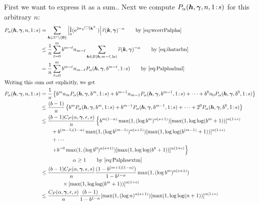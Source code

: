 \documentclass[authoryear]{elsarticle}
\newcommand{\tr}{\widetilde{r}}
\DeclareMathOperator{\appxint}{\hat{I}}
\newcommand{\onetos}{1\!:\!s}
\newcommand{\LarysaNote}[1]{{\color{violet}#1}}
\begin{document}
\LarysaNote{First we want to express it as a sum.. } 
Next we compute $P_\alpha(\vh,\vgamma,n,\onetos)$ for this arbitrary $n$:
\begin{align*}
      P_\alpha(\vh,\vgamma,n,\onetos) & = \sum_{\vk \in \integers^s \setminus\{\vzero\}} \abs{\appxint_n(\me^{2 \pi \sqrt{-1} \vk^T \cdot})}\tr(\vk,\vgamma)^{-\alpha} \qquad \text{by \eqref{eq:wcerrPalpha}} \\
      & \le \frac {1}{n} \sum_{\ell = 0}^{m} b^{m-\ell} n_{m - \ell} \sum_{\vk \in B(\vh,m-\ell,\onetos)} \tr(\vk,\vgamma)^{-\alpha}
      \qquad \text{by \eqref{eq:ihatarbn}}\\
      & = \frac {1}{n} \sum_{\ell = 0}^{m} b^{m-\ell} n_{m - \ell} P_\alpha(\vh,\vgamma,b^{m-\ell},\onetos)
      \qquad \text{by \eqref{eq:Palphadual}}\\
\intertext{Writing this sum out explicitly, we get}
      P_\alpha(\vh,\vgamma,n,\onetos) & =  \frac {1}{n} \left\{ b^m n_m P_\alpha(\vh,\vgamma,b^m,\onetos) + b^{m-1} n_{m-1} P_\alpha(\vh,\vgamma,b^{m-1},\onetos) + \cdots + b^0 n_0 P_\alpha(\vh,\vgamma,b^0,\onetos)  \right\} \\
      &\le \frac {(b-1)}{n} \left\{ b^m  P_\alpha(\vh,\vgamma,b^m,\onetos) + b^{m-1}  P_\alpha(\vh,\vgamma,b^{m-1},\onetos) + \cdots + 2^0  P_\alpha(\vh,\vgamma,b^0,\onetos)  \right\} \\
      & \le \frac {(b-1)C_{P}(\alpha,\vgamma,\epsilon,s)}{n} \left\{ b^{m(1-\alpha)}\max(1, (\log b^{m})^{\alpha(s+1)}) [\max(1,\log \log (
    b^m+1))]^{\alpha(1+\epsilon)}\right .\\ 
      & \qquad  + b^{(m-1)(1-\alpha)}\max(1, (\log b^{(m-1)})^{\alpha(s+1)}) [\max(1,\log \log (
    b^{(m-1)}+1))]^{\alpha(1+\epsilon)}\\
      & \qquad + \cdots \\
      & \qquad  \left . + b^{-0}\max(1, (\log b^{0})^{\alpha(s+1)}) [\max(1,\log \log (
    b^{0}+1))]^{\alpha(1+\epsilon)} \right\}\\
      & \qquad \qquad \qquad \alpha \ge 1 \qquad \text{by \eqref{eq:Palphaextm}}\\
      & \le \frac {(b-1)C_{P}(\alpha,\vgamma,\epsilon,s)}{n} \frac{(1 - b^{(m+1)(1-\alpha)})}{1 - b^{1-\alpha}}
      \max(1, (\log b^{m})^{\alpha(s+1)}) \\
      & \qquad \qquad \times [\max(1,\log \log (
    b^m+1))]^{\alpha(1+\epsilon)} \\
      & \le \frac {C_{P}(\alpha,\vgamma,\epsilon,s)}{n} \frac{(b-1)}{1 - b^{1-\alpha}}
  [\max(1, (\log n)^{\alpha(s+1)})
      [\max(1,\log \log (n+1))]^{\alpha(1+\epsilon)} 
\end{align*}
\end{document}

